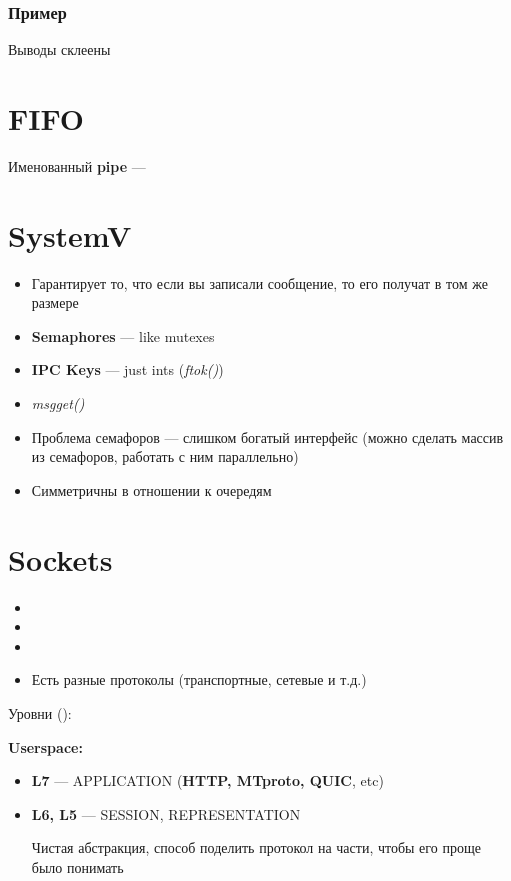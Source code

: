 \documentclass[../../lectures.tex]{subfiles}
\begin{document}
\subsubsection{Пример}
Выводы склеены

\section{FIFO}
Именованный \textbf{pipe} --- 

\newpage
\section{SystemV}
\begin{itemize}
    \item Гарантирует то, что если вы записали сообщение, то его получат в том же размере
    \item \textbf{Semaphores} --- like mutexes
    \item \textbf{IPC Keys} --- just ints (\emph{ftok()})
    \item \emph{msgget()}
    \item Проблема семафоров --- слишком богатый интерфейс (можно сделать массив из семафоров, работать с ним параллельно)
    \item Симметричны в отношении к очередям 
\end{itemize}

\newpage
\section{Sockets}
\begin{itemize}
    \item {}
    \item {}
    \item {}
    \item Есть разные протоколы (транспортные, сетевые и т.д.)
\end{itemize}
Уровни ():

\textbf{Userspace:}
\begin{itemize}
    \item \textbf{L7} --- APPLICATION (\textbf{HTTP, MTproto, QUIC}, etc)
    \item \textbf{L6, L5} --- SESSION, REPRESENTATION

          Чистая абстракция, способ поделить протокол на части, чтобы его проще было понимать
\end{itemize}
\end{document}
